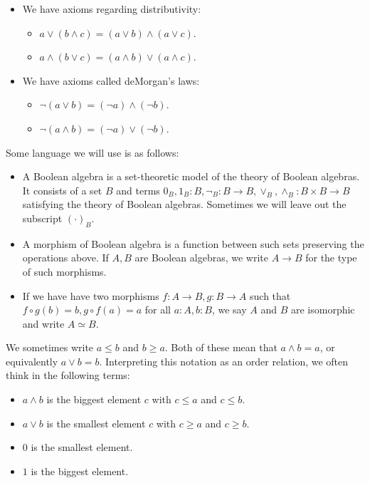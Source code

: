 \documentclass{../util/zariski-small}
\begin{document}
\begin{definition}
\begin{itemize}
\begin{itemize}
      \end{itemize}
    \item We have axioms regarding distributivity:
      \begin{itemize}
        \item $a \vee (b \wedge c) = ( a \vee b) \wedge (a \vee c)$. 
        \item $a \wedge (b \vee c) = (a \wedge b) \vee ( a\wedge c)$. 
      \end{itemize}
    \item We have axioms called deMorgan's laws:
      \begin{itemize}
        \item $\neg (a \vee b ) = (\neg a) \wedge (\neg b)$. 
        \item $\neg (a \wedge b) = (\neg a) \vee (\neg b)$. 
      \end{itemize}
  \end{itemize}
\end{definition}
\begin{definition}
  Some language we will use is as follows:
  \begin{itemize}
    \item A Boolean algebra is a set-theoretic model of the theory of Boolean algebras. 
      It consists of a set $B$ and terms $0_B,1_B: B, \neg_B : B \to B, \vee_B, \wedge_B : B \times B \to B$ 
      satisfying the theory of Boolean algebras. 
      Sometimes we will leave out the subscript $(\cdot)_B$. 
    \item A morphism of Boolean algebra is a function between such sets preserving the operations above. 
      If $A,B$ are Boolean algebras, we write $A \to B$ for the type of such morphisms. 
    \item If we have have two morphisms $f:A\to B , g : B \to A$ such that 
      $f\circ g (b) = b, g \circ f (a) = a$ for all $a:A, b:B$, 
      we say $A$ and $B$ are isomorphic and write $A \simeq B$. 
  \end{itemize}
\end{definition}
\begin{remark}
  We sometimes write $a \leq b$ and  $b \geq a$. Both of these mean that 
  $a\wedge b = a$, or equivalently $ a\vee b = b$. 
  Interpreting this notation as an order relation, we often think in the following terms:
  \begin{itemize}
    \item $a\wedge b$ is the biggest element $c$ with $c \leq a$ and $c\leq b$.
    \item $a\vee b$ is the smallest element $c$ with $c \geq a$ and $c \geq b$. 
    \item $0$ is the smallest element. 
    \item $1$ is the biggest element. 
  \end{itemize}
\end{remark}
\end{document}
